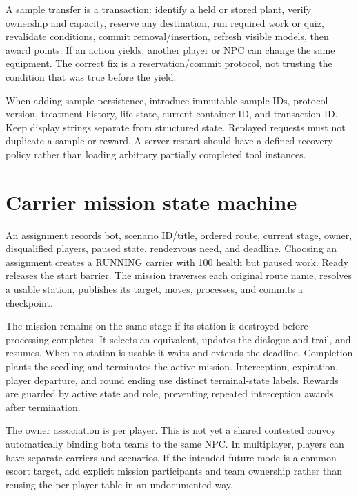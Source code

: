 A sample transfer is a transaction: identify a held or stored plant, verify ownership and capacity, reserve any destination, run required work or quiz, revalidate conditions, commit removal/\allowbreak{}insertion, refresh visible models, then award points.\allowbreak{} If an action yields, another player or NPC can change the same equipment.\allowbreak{} The correct fix is a reservation/\allowbreak{}commit protocol, not trusting the condition that was true before the yield.\allowbreak{}

When adding sample persistence, introduce immutable sample IDs, protocol version, treatment history, life state, current container ID, and transaction ID.\allowbreak{} Keep display strings separate from structured state.\allowbreak{} Replayed requests must not duplicate a sample or reward.\allowbreak{} A server restart should have a defined recovery policy rather than loading arbitrary partially completed tool instances.\allowbreak{}

\section{Carrier mission state machine}
An assignment records bot, scenario ID/\allowbreak{}title, ordered route, current stage, owner, disqualified players, paused state, rendezvous need, and deadline.\allowbreak{} Choosing an assignment creates a RUNNING carrier with 100 health but paused work.\allowbreak{} Ready releases the start barrier.\allowbreak{} The mission traverses each original route name, resolves a usable station, publishes its target, moves, processes, and commits a checkpoint.\allowbreak{}

The mission remains on the same stage if its station is destroyed before processing completes.\allowbreak{} It selects an equivalent, updates the dialogue and trail, and resumes.\allowbreak{} When no station is usable it waits and extends the deadline.\allowbreak{} Completion plants the seedling and terminates the active mission.\allowbreak{} Interception, expiration, player departure, and round ending use distinct terminal-state labels.\allowbreak{} Rewards are guarded by active state and role, preventing repeated interception awards after termination.\allowbreak{}

The owner association is per player.\allowbreak{} This is not yet a shared contested convoy automatically binding both teams to the same NPC.\allowbreak{} In multiplayer, players can have separate carriers and scenarios.\allowbreak{} If the intended future mode is a common escort target, add explicit mission participants and team ownership rather than reusing the per-player table in an undocumented way.\allowbreak{}

